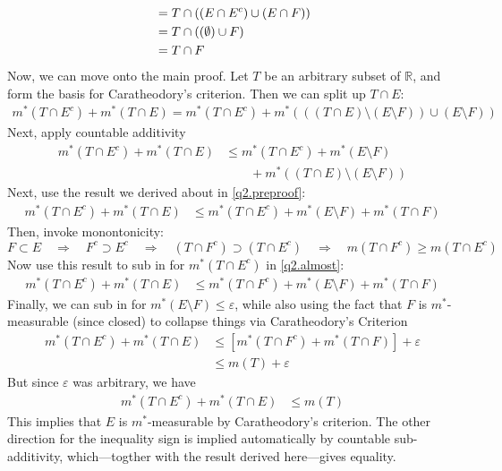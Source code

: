 \documentclass[12pt]{article}
\theoremstyle{plain}
\theoremstyle{definition}
\theoremstyle{remark}
\begin{document}
\begin{enumerate}
\begin{enumerate}
\begin{align}
        &= T\cap ((E \cap E^c) \cup (E\cap F)) \notag\\
        &= T\cap ((\emptyset)\cup F) \notag\\
        &= T\cap F
        \label{q2.preproof}
\end{align}
Now, we can move onto the main proof. Let $T$ be an arbitrary subset of $\mathbb{R}$, and form the basis for Caratheodory's criterion. Then we can split up $T\cap E$:
\begin{align*}
    m^*(T\cap E^c) +  m^*(T\cap E) = 
    m^*(T\cap E^c) +  m^*(( (T\cap E)\setminus (E\setminus F) )  
    \cup (E\setminus F))
\end{align*}
Next, apply countable additivity 
\begin{align*}
    m^*(T\cap E^c) +  m^*(T\cap E) &\leq 
    m^*(T\cap E^c) + m^*(E\setminus F) \\
    &\qquad   + m^*( (T\cap E)\setminus (E\setminus F) )  
\end{align*}
Next, use the result we derived about in \ref{q2.preproof}:
\begin{align}
    m^*(T\cap E^c) +  m^*(T\cap E) &\leq 
    m^*(T\cap E^c) + m^*(E\setminus F) 
    + m^*(T\cap F)
    \label{q2.almost}
\end{align}
Then, invoke monontonicity:
\[
    F\subset E 
    \quad \Rightarrow \quad
    F^c\supset E^c
    \quad \Rightarrow \quad
    (T\cap F^c)\supset (T\cap E^c)
    \quad \Rightarrow \quad
    m(T \cap F^c) \geq m(T \cap E^c)
\]
Now use this result to sub in for $m^*(T\cap E^c)$ in \ref{q2.almost}:
\begin{align}
    m^*(T\cap E^c) +  m^*(T\cap E) &\leq 
    m^*(T\cap F^c) + m^*(E\setminus F) 
    + m^*(T\cap F)
\end{align}
Finally, we can sub in for $m^*(E\setminus F)\leq \varepsilon$, while also using the fact that $F$ is $m^*$-measurable (since closed) to collapse things via Caratheodory's Criterion
\begin{align*}
    m^*(T\cap E^c) +  m^*(T\cap E) &\leq 
    [m^*(T\cap F^c) + 
     m^*(T\cap F)] 
    +\varepsilon \\
    &\leq 
    m(T)
    +\varepsilon 
\end{align*}
But since $\varepsilon$ was arbitrary, we have 
\begin{align*}
    m^*(T\cap E^c) +  m^*(T\cap E) &\leq 
    m(T)
\end{align*}
This implies that $E$ is $m^*$-measurable by Caratheodory's criterion. The other direction for the inequality sign is implied automatically by countable sub-additivity, which---togther with the result derived here---gives equality.


\end{enumerate}
\end{enumerate}
\end{document}
